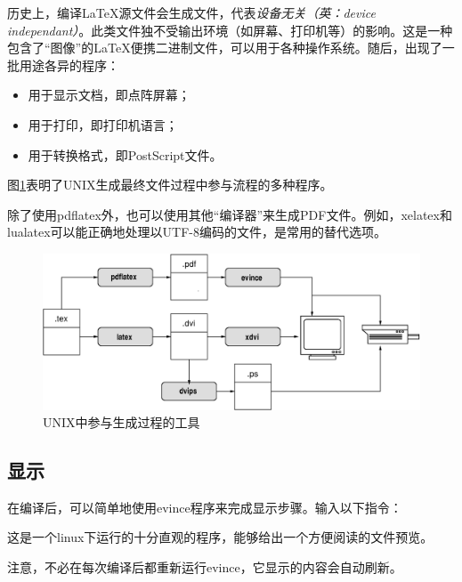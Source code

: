 \begin{exclamation}
    历史上，编译\LaTeX 源文件会生成文件，代表\textit{设备无关（英：device independant）}。此类文件独不受输出环境（如屏幕、打印机等）的影响。这是一种包含了“图像”的\LaTeX 便携二进制文件，可以用于各种操作系统。随后，出现了一批用途各异的程序：
    \begin{itemize}
        \item 用于显示文档，即\rightarrow 点阵屏幕；
        \item 用于打印，即\rightarrow 打印机语言；
        \item 用于转换格式，即\rightarrow PostScript文件。
    \end{itemize}
\end{exclamation}

图\ref{fig:1.2}表明了UNIX生成最终文件过程中参与流程的多种程序。

\begin{exclamation}
    除了使用pdflatex外，也可以使用其他“编译器”来生成PDF文件。例如，xelatex和lualatex可以能正确地处理以UTF-8编码的文件，是常用的替代选项。
\end{exclamation}

\begin{figure}[H]
    \centering
    \includegraphics[width = 0.8\linewidth]{img/cycle.eps}
    \caption{UNIX中参与生成过程的工具}
    \label{fig:1.2}
\end{figure}

\subsection{显示}%

在编译后，可以简单地使用\textsf{evince}程序来完成显示步骤。输入以下指令：


这是一个\textsf{linux}下运行的十分直观的程序，能够给出一个方便阅读的文件预览。

\begin{exclamation}
    注意，不必在每次编译后都重新运行evince，它显示的内容会自动刷新。
\end{exclamation}

